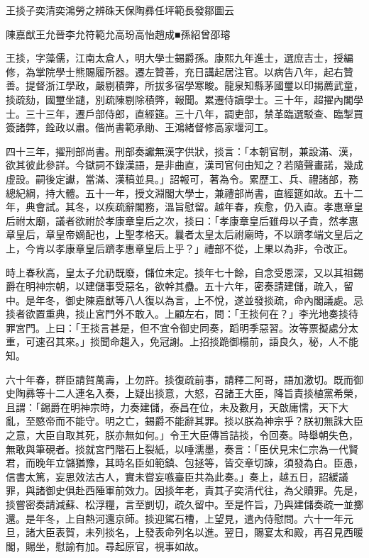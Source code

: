 
\begin{pinyinscope}
王掞子奕清奕鴻勞之辨硃天保陶彞任坪範長發鄒圖云

陳嘉猷王允晉李允符範允高玢高怡趙成■孫紹曾邵璿

王掞，字藻儒，江南太倉人，明大學士錫爵孫。康熙九年進士，選庶吉士，授編修，為掌院學士熊賜履所器。遷左贊善，充日講起居注官。以病告八年，起右贊善。提督浙江學政，嚴剔積弊，所拔多宿學寒畯。龍泉知縣茅國璽以印揭薦武童，掞疏劾，國璽坐譴，別疏陳剔除積弊，報聞。累遷侍讀學士。三十年，超擢內閣學士。三十三年，遷戶部侍郎，直經筵。三十八年，調吏部，禁革臨選駁查、臨掣買簽諸弊，銓政以肅。偕尚書範承勛、王鴻緒督修高家堰河工。

四十三年，擢刑部尚書。刑部奏讞無漢字供狀，掞言：「本朝官制，兼設滿、漢，欲其彼此參詳。今獄詞不錄漢語，是非曲直，漢司官何由知之？若隨聲畫諾，幾成虛設。嗣後定讞，當滿、漢稿並具。」詔報可，著為令。累歷工、兵、禮諸部，務總紀綱，持大體。五十一年，授文淵閣大學士，兼禮部尚書，直經筵如故。五十二年，典會試。其冬，以疾疏辭閣務，溫旨慰留。越年春，疾愈，仍入直。孝惠章皇后祔太廟，議者欲祔於孝康章皇后之次，掞曰：「孝康章皇后雖母以子貴，然孝惠章皇后，章皇帝嫡配也，上聖孝格天。曩者太皇太后祔廟時，不以躋孝端文皇后之上，今肯以孝康章皇后躋孝惠章皇后上乎？」禮部不從，上果以為非，令改正。

時上春秋高，皇太子允礽既廢，儲位未定。掞年七十餘，自念受恩深，又以其祖錫爵在明神宗朝，以建儲事受惡名，欲幹其蠱。五十六年，密奏請建儲，疏入，留中。是年冬，御史陳嘉猷等八人復以為言，上不悅，遂並發掞疏，命內閣議處。忌掞者欲置重典，掞止宮門外不敢入。上顧左右，問：「王掞何在？」李光地奏掞待罪宮門。上曰：「王掞言甚是，但不宜令御史同奏，蹈明季惡習。汝等票擬處分太重，可速召其來。」掞聞命趨入，免冠謝。上招掞跪御榻前，語良久，秘，人不能知。

六十年春，群臣請賀萬壽，上勿許。掞復疏前事，請釋二阿哥，語加激切。既而御史陶彞等十二人連名入奏，上疑出掞意，大怒，召諸王大臣，降旨責掞植黨希榮，且謂：「錫爵在明神宗時，力奏建儲，泰昌在位，未及數月，天啟庸懦，天下大亂，至愍帝而不能守。明之亡，錫爵不能辭其罪。掞以朕為神宗乎？朕初無誅大臣之意，大臣自取其死，朕亦無如何。」令王大臣傳旨詰掞，令回奏。時舉朝失色，無敢與筆硯者。掞就宮門階石上裂紙，以唾濡墨，奏言：「臣伏見宋仁宗為一代賢君，而晚年立儲猶豫，其時名臣如範鎮、包拯等，皆交章切諫，須發為白。臣愚，信書太篤，妄思效法古人，實未嘗妄嗾臺臣共為此奏。」奏上，越五日，詔緩議罪，與諸御史俱赴西陲軍前效力。因掞年老，責其子奕清代往，為父贖罪。先是，掞嘗密奏請減蘇、松浮糧，言至剴切，疏久留中。至是忤旨，乃與建儲奏疏一並擲還。是年冬，上自熱河還京師。掞迎駕石槽，上望見，遣內侍慰問。六十一年元旦，諸大臣表賀，未列掞名，上發表命列名以進。翌日，賜宴太和殿，再召見西暖閣，賜坐，慰諭有加。尋起原官，視事如故。


\end{pinyinscope}
